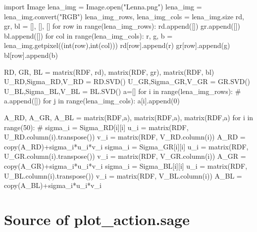 \begin{sageoutput}[d,0,19]
import Image
lena_img = Image.open("Lenna.png")
lena_img = lena_img.convert("RGB")
lena_img_rows, lena_img_cols = lena_img.size
rd, gr, bl = [], [], []
for row in range(lena_img_rows):
    rd.append([])
    gr.append([])
    bl.append([])
    for col in range(lena_img_cols):
        r, g, b = lena_img.getpixel((int(row),int(col)))
        rd[row].append(r)
        gr[row].append(g)
        bl[row].append(b)

RD, GR, BL = matrix(RDF, rd), matrix(RDF, gr), matrix(RDF, bl)
U_RD,Sigma_RD,V_RD = RD.SVD()
U_GR,Sigma_GR,V_GR = GR.SVD()
U_BL,Sigma_BL,V_BL = BL.SVD()
a=[]
for i in range(lena_img_rows): #
    a.append([])
    for j in range(lena_img_cols):
        a[i].append(0)

A_RD, A_GR, A_BL = matrix(RDF,a), matrix(RDF,a), matrix(RDF,a)
for i in range(50): #
    sigma_i = Sigma_RD[i][i]
    u_i = matrix(RDF, U_RD.column(i).transpose())
    v_i = matrix(RDF, V_RD.column(i))
    A_RD = copy(A_RD)+sigma_i*u_i*v_i
    sigma_i = Sigma_GR[i][i]
    u_i = matrix(RDF, U_GR.column(i).transpose())
    v_i = matrix(RDF, V_GR.column(i))
    A_GR = copy(A_GR)+sigma_i*u_i*v_i
    sigma_i = Sigma_BL[i][i]
    u_i = matrix(RDF, U_BL.column(i).transpose())
    v_i = matrix(RDF, V_BL.column(i))
    A_BL = copy(A_BL)+sigma_i*u_i*v_i
\end{sageoutput}
 




\section{Source of plot\_action.sage}


\endinput


TODO:
1) mention Sage matrices are not mutable in matrix introduction.
Is mutable discussed in Intro?